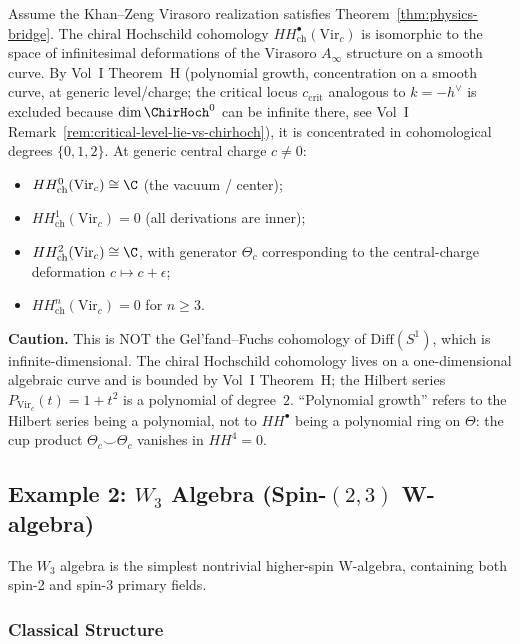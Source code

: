 \begin{proposition}
Assume the Khan--Zeng Virasoro realization satisfies
Theorem~\ref{thm:physics-bridge}.
The chiral Hochschild cohomology $HH^\bullet_{\text{ch}}(\text{Vir}_c)$ is isomorphic
to the space of infinitesimal deformations of the Virasoro $A_\infty$ structure on a
smooth curve. By Vol~I Theorem~H (polynomial growth, concentration on a smooth curve,
at generic level/charge; the critical locus $c_{\mathrm{crit}}$ analogous to $k = -h^\vee$
is excluded because $\dim \ChirHoch^0$ can be infinite there, see Vol~I
Remark~\ref*{rem:critical-level-lie-vs-chirhoch}),
it is concentrated in cohomological degrees $\{0,1,2\}$. At generic central charge $c \neq 0$:
\begin{itemize}
\item $HH^0_{\text{ch}}(\text{Vir}_c) \cong \C$ (the vacuum / center);
\item $HH^1_{\text{ch}}(\text{Vir}_c) = 0$ (all derivations are inner);
\item $HH^2_{\text{ch}}(\text{Vir}_c) \cong \C$, with generator $\Theta_c$ corresponding
 to the central-charge deformation $c \mapsto c + \epsilon$;
\item $HH^n_{\text{ch}}(\text{Vir}_c) = 0$ for $n \geq 3$.
\end{itemize}
\textbf{Caution.} This is NOT the Gel'fand--Fuchs cohomology of $\mathrm{Diff}(S^1)$,
which is infinite-dimensional. The chiral Hochschild cohomology lives on a one-dimensional
algebraic curve and is bounded by Vol~I Theorem~H; the Hilbert series
$P_{\text{Vir}_c}(t) = 1 + t^2$ is a polynomial of degree~$2$. ``Polynomial growth''
refers to the Hilbert series being a polynomial, not to $HH^\bullet$ being a polynomial
ring on $\Theta$: the cup product $\Theta_c \smile \Theta_c$ vanishes in $HH^4 = 0$.
\end{proposition}

\subsection{Example 2: $W_3$ Algebra (Spin-$(2,3)$ W-algebra)}

The $W_3$ algebra is the simplest nontrivial higher-spin W-algebra, containing both spin-2 and spin-3 primary fields.

\subsubsection{Classical Structure}

